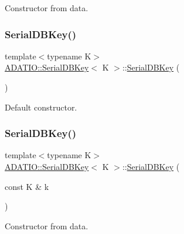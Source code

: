 Constructor from data. 

\mbox{\label{classADATIO_1_1SerialDBKey_acaf28250dcc8a2b3944f7edef046df05}} 
\subsubsection{\texorpdfstring{SerialDBKey()}{SerialDBKey()}\hspace{0.1cm}{\footnotesize\ttfamily [3/6]}}
{\footnotesize\ttfamily template$<$typename K$>$ \\
\mbox{\hyperlink{classADATIO_1_1SerialDBKey}{A\+D\+A\+T\+I\+O\+::\+Serial\+D\+B\+Key}}$<$ K $>$\+::\mbox{\hyperlink{classADATIO_1_1SerialDBKey}{Serial\+D\+B\+Key}} (\begin{DoxyParamCaption}{ }\end{DoxyParamCaption})\hspace{0.3cm}{\ttfamily [inline]}}



Default constructor. 

\mbox{\label{classADATIO_1_1SerialDBKey_ad035f1ac5d8565aec4e5a7197333123f}} 
\subsubsection{\texorpdfstring{SerialDBKey()}{SerialDBKey()}\hspace{0.1cm}{\footnotesize\ttfamily [4/6]}}
{\footnotesize\ttfamily template$<$typename K$>$ \\
\mbox{\hyperlink{classADATIO_1_1SerialDBKey}{A\+D\+A\+T\+I\+O\+::\+Serial\+D\+B\+Key}}$<$ K $>$\+::\mbox{\hyperlink{classADATIO_1_1SerialDBKey}{Serial\+D\+B\+Key}} (\begin{DoxyParamCaption}\item[{const K \&}]{k }\end{DoxyParamCaption})\hspace{0.3cm}{\ttfamily [inline]}}



Constructor from data. 

